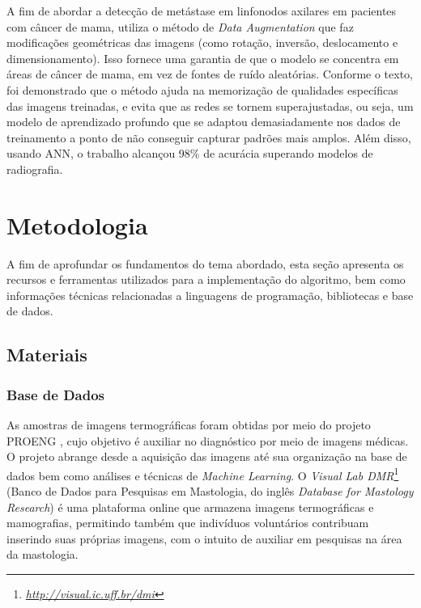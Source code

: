 A fim de abordar a detecção de metástase em linfonodos axilares em pacientes com câncer de mama,  utiliza o método de \textit{Data Augmentation} que faz modificações geométricas das imagens (como rotação, inversão, deslocamento e dimensionamento). Isso fornece uma garantia de que o modelo se concentra em áreas de câncer de mama, em vez de fontes de ruído aleatórias. Conforme o texto, foi demonstrado que o método ajuda na memorização de qualidades específicas das imagens treinadas, e evita que as redes se tornem superajustadas, ou seja, um modelo de aprendizado profundo que se adaptou demasiadamente nos dados de treinamento a ponto de não conseguir capturar padrões mais amplos. Além disso, usando ANN, o trabalho alcançou 98\% de acurácia superando modelos de radiografia.




\section{\esp Metodologia} \label{metodologia}
A fim de aprofundar os fundamentos do tema abordado, esta seção apresenta os recursos e ferramentas utilizados para a implementação do algoritmo, bem como informações técnicas relacionadas a linguagens de programação, bibliotecas e base de dados.



\subsection{\esp Materiais} \label{materiais}


\subsubsection{\esp Base de Dados} \label{database}

As amostras de imagens termográficas foram obtidas por meio do projeto PROENG , cujo objetivo é auxiliar no diagnóstico por meio de imagens médicas. O projeto abrange desde a aquisição das imagens até sua organização na base de dados bem como análises e técnicas de \textit{Machine Learning}. O \textit{Visual Lab DMR}\footnote{\href{http://visual.ic.uff.br/dmi}{\textit{http://visual.ic.uff.br/dmi}}} (Banco de Dados para Pesquisas em Mastologia, do inglês \textit{Database for Mastology Research}) é uma plataforma online que armazena imagens termográficas e mamografias, permitindo também que indivíduos voluntários contribuam inserindo suas próprias imagens, com o intuito de auxiliar em pesquisas na área da mastologia.

